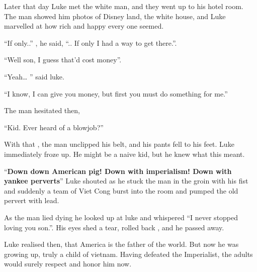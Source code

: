 Later that day Luke met the white man, and they went up to his
hotel room. The man showed him photos of Disney land, the white
house, and Luke marvelled at how rich and happy every one
seemed.



``If only..'' , he said, ``.. If only I had a way to get
there.''.



``Well son, I guess that'd cost money''.



``Yeah{\ldots} '' said luke.



``I know, I can give you money, but first you must do something for
me.''



The man hesitated then,



``Kid. Ever heard of a blowjob?''



With that , the man unclipped his belt, and his pants fell to his
feet. Luke immediately froze up. He might be a naive kid, but he
knew what this meant.



``{\bf Down down American pig! Down with imperialism! Down with yankee
perverts}'' Luke shouted as he stuck the man in the groin with his
fist and suddenly a team of Viet Cong burst into the room and
pumped the old pervert with lead.



As the man lied dying he looked up at luke and whispered ``I never
stopped loving you son.''. His eyes shed a tear, rolled back , and
he passed away.



Luke realised then, that America is the father of the world. But
now he was growing up, truly a child of vietnam. Having defeated
the Imperialist, the adults would surely respect and honor him now.

 




